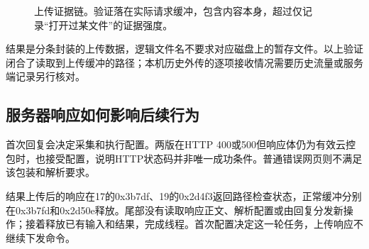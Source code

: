 \documentclass[UTF8,a4paper,zihao=5,fontset=windows]{ctexart}
\newcommand{\code}[1]{{\ttfamily\small #1}}
\begin{document}
\begin{figure}[H]\centering
{}
\caption{上传证据链。验证落在实际请求缓冲，包含内容本身，超过仅记录“打开过某文件”的证据强度。}
\end{figure}

结果是分条封装的上传数据，逻辑文件名不要求对应磁盘上的暂存文件。以上验证闭合了读取到上传缓冲的路径；本机历史外传的逐项接收情况需要历史流量或服务端记录另行核对。

\subsection{服务器响应如何影响后续行为}
首次回复会决定采集和执行配置。两版在HTTP 400或500但响应体仍为有效云控包时，也接受配置，说明HTTP状态码并非唯一成功条件。普通错误网页则不满足该包装和解析要求。

结果上传后的响应在17的\code{0x3b7df}、19的\code{0x2d4f3}返回路径检查状态，正常缓冲分别在\code{0x3b7fd}和\code{0x2d50e}释放。尾部没有读取响应正文、解析配置或由回复分发新操作；接着释放已有输入和结果，完成线程。首次配置决定这一轮任务，上传响应不继续下发命令。
\end{document}
